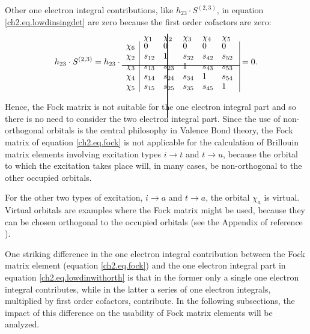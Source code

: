 Other one electron integral contributions, like $h_{23} \cdot S^{(2,3)}$, in equation \ref{ch2.eq.lowdinsingdet} are zero because the first order cofactors are zero:
\begin{equation}
h_{23} \cdot S^{(2,3)} = h_{23} \cdot
\begin{array}{llllll}
 & \hskip 28.0 pt \hbox{\lower 93pt\hbox{\vrule height100pt width 1.0pt}}\hskip-29.0pt \chi_1 & \chi_2 & \chi_3 & \chi_4 & \chi_5 \\
 \noalign{\vskip-91pt}
 \chi_6 & \multicolumn{1}{|l}{ 0 } & 0 & 0 & 0 & \multicolumn{1}{l|}{ 0 } \\
 \chi_2 & \multicolumn{1}{|l}{ s_{12} } & 1 & s_{32} & s_{42} & \multicolumn{1}{l|}{ s_{52} } \\
 \chi_3 & \multicolumn{1}{|l}{ s_{13} } & s_{23} & 1 & s_{43} & \multicolumn{1}{l|}{ s_{53} } \\
 \noalign{\vskip-8pt}
 \multispan6\hbox{\vrule  height 1.0 pt width140pt}\cr
 \noalign{\vskip 7pt}
 \chi_4 & \multicolumn{1}{|l}{ s_{14} } & s_{24} & s_{34} & 1 & \multicolumn{1}{l|}{ s_{54} } \\
 \chi_5 & \multicolumn{1}{|l}{ s_{15} } & s_{25} & s_{35} & s_{45} & \multicolumn{1}{l|}{ 1 }
\end{array} = 0.
\label{ch2.eq.h23}
\end{equation}

Hence, the Fock matrix is not suitable for the one electron integral part and so there is no need to consider the two electron integral part. Since the use of non-orthogonal orbitals is the central philosophy in Valence Bond theory, the Fock matrix of equation \ref{ch2.eq.fock} is not applicable for the calculation of Brillouin matrix elements involving excitation types $i \rightarrow t$ and $t \rightarrow u$, because the orbital to which the excitation takes place will, in many cases, be non-orthogonal to the other occupied orbitals. 
 
For the other two types of excitation, $i \rightarrow a$ and $t \rightarrow a$, the orbital $\chi_a$ is virtual. Virtual orbitals are examples where the Fock matrix might be used, because they can be chosen orthogonal to the occupied orbitals (see the Appendix of reference \cite{koos1}).

One striking difference in the one electron integral contribution between the Fock matrix element (equation \ref{ch2.eq.fock}) and the one electron integral part in equation \ref{ch2.eq.lowdinwithorth} is that in the former only a single one electron integral contributes, while in the latter a series of one electron integrals, multiplied by first order cofactors, contribute. In the following subsections, the impact of this difference on the usability of Fock matrix elements will be analyzed.

